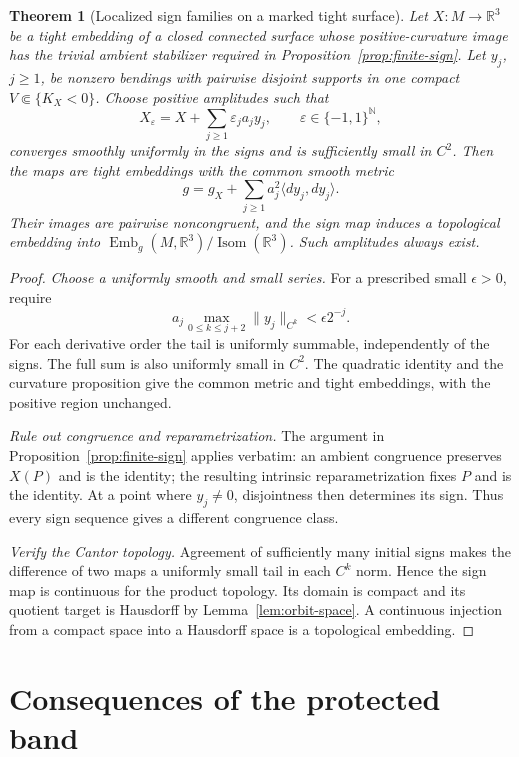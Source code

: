 \documentclass[11pt]{amsart}
\newtheorem{theorem}{Theorem}[section]
\theoremstyle{definition}
\theoremstyle{remark}
\newcommand{\R}{\mathbb R}\newcommand{\Sph}{\mathbb S}
\DeclareMathOperator{\Isom}{Isom}\DeclareMathOperator{\Emb}{Emb}
\numberwithin{equation}{section}
\begin{document}
\begin{theorem}[Localized sign families on a marked tight surface]
\label{thm:localized-sign}
Let $X:M\to\R^3$ be a tight embedding of a closed connected surface
whose positive-curvature image has the trivial ambient stabilizer
required in Proposition~\ref{prop:finite-sign}. Let $y_j$, $j\ge1$,
be nonzero bendings with pairwise disjoint supports in
one compact $V\Subset\{K_X<0\}$. Choose positive amplitudes such that
\[
 X_\varepsilon=X+\sum_{j\ge1}\varepsilon_ja_jy_j,
 \qquad\varepsilon\in\{-1,1\}^{\mathbb N},
\]
converges smoothly uniformly in the signs and is sufficiently small in
$C^2$. Then the maps are tight embeddings with the common smooth metric
\[
 g=g_X+\sum_{j\ge1}a_j^2\langle dy_j,dy_j\rangle.
\]
Their images are pairwise noncongruent, and the sign map induces a
topological embedding into $\Emb_g(M,\R^3)/\Isom(\R^3)$.
Such amplitudes always exist.
\end{theorem}
\begin{proof}
\emph{Choose a uniformly smooth and small series.}
For a prescribed small $\epsilon>0$, require
\[
 a_j\max_{0\le k\le j+2}\|y_j\|_{C^k}<\epsilon2^{-j}.
\]
For each derivative order the tail is uniformly summable, independently
of the signs. The full sum is also uniformly small in $C^2$.
The quadratic identity and the curvature proposition give the common
metric and tight embeddings, with the positive region unchanged.

\emph{Rule out congruence and reparametrization.}
The argument in Proposition~\ref{prop:finite-sign} applies verbatim:
an ambient congruence preserves $X(P)$ and is the identity; the resulting
intrinsic reparametrization fixes $P$ and is the identity. At a point
where $y_j\ne0$, disjointness then determines its sign. Thus every sign
sequence gives a different congruence class.

\emph{Verify the Cantor topology.}
Agreement of sufficiently many initial signs makes the difference of two
maps a uniformly small tail in each $C^k$ norm. Hence the sign map is
continuous for the product topology. Its domain is compact and its
quotient target is Hausdorff by Lemma~\ref{lem:orbit-space}. A continuous
injection from a compact space into a Hausdorff space is a topological
embedding.
\end{proof}

\section{Consequences of the protected band}\label{sec:applications}
\end{document}
